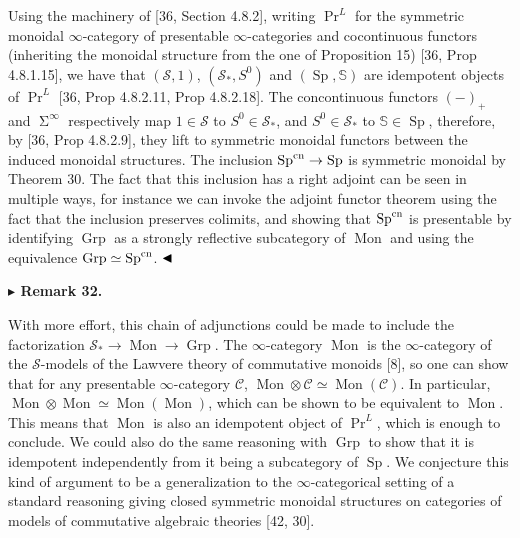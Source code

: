 \documentclass[10pt,a4paper]{article}
\begin{document}
Using the machinery of [36, Section 4.8.2], writing $\Pr^{L}$ for the symmetric monoidal $\infty$-category of presentable $\infty$-categories and cocontinuous functors (inheriting the monoidal structure from the one of Proposition 15) [36, Prop 4.8.1.15], we have that $({\mathcal{S}},1)$, $({\mathcal{S}}_{*},S^{0})$ and $(\operatorname{Sp},\mathbb{S})$ are idempotent objects of $\Pr^{L}$ [36, Prop 4.8.2.11, Prop 4.8.2.18]. The concontinuous functors $(-)_{+}$ and $\operatorname{\Sigma}^{\infty}$ respectively map $1\in{\mathcal{S}}$ to $S^{0}\in{\mathcal{S}}_{*}$, and $S^{0}\in{\mathcal{S}}_{*}$ to $\mathbb{S}\in\operatorname{Sp}$, therefore, by [36, Prop 4.8.2.9], they lift to symmetric monoidal functors between the induced monoidal structures. The inclusion $\operatorname{Sp}^{\textnormal{cn}}\to\operatorname{Sp}$ is symmetric monoidal by Theorem 30. The fact that this inclusion has a right adjoint can be seen in multiple ways, for instance we can invoke the adjoint functor theorem using the fact that the inclusion preserves colimits, and showing that $\operatorname{Sp}^{\textnormal{cn}}$ is presentable by identifying $\operatorname{Grp}$ as a strongly reflective subcategory of $\operatorname{Mon}$ and using the equivalence $\operatorname{Grp}\simeq\operatorname{Sp}^{\textnormal{cn}}$. $\hfill\blacktriangleleft$\par
 
 
 
\par\medskip\noindent\textbf{$\blacktriangleright$ Remark 32.}\par
 
 
With more effort, this chain of adjunctions could be made to include the factorization ${\mathcal{S}}_{*}\to\operatorname{Mon}\to\operatorname{Grp}$. The $\infty$-category $\operatorname{Mon}$ is the $\infty$-category of the ${\mathcal{S}}$-models of the Lawvere theory of commutative monoids [8], so one can show that for any presentable $\infty$-category ${\mathcal{C}}$, ${\operatorname{Mon}}\otimes{\mathcal{C}}\simeq\operatorname{Mon}({\mathcal{C}})$. In particular, $\operatorname{Mon}\otimes\operatorname{Mon}\simeq\operatorname{Mon}(\operatorname{Mon})$, which can be shown to be equivalent to $\operatorname{Mon}$. This means that $\operatorname{Mon}$ is also an idempotent object of $\Pr^{L}$, which is enough to conclude. We could also do the same reasoning with $\operatorname{Grp}$ to show that it is idempotent independently from it being a subcategory of $\operatorname{Sp}$. We conjecture this kind of argument to be a generalization to the $\infty$-categorical setting of a standard reasoning giving closed symmetric monoidal structures on categories of models of commutative algebraic theories [42, 30].\par
 
\end{document}
